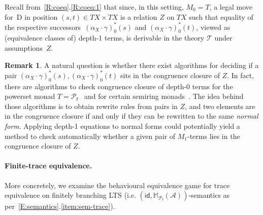 \documentclass[sigconf,
			final%
			nonacm
                        ]{acmart}
\numberwithin{equation}{section}
\numberwithin{equation}{section}
\theoremstyle{plain}
\theoremstyle{definition}
\newtheorem{rem}[thm]{Remark}
\newcommand{\id}{\mathsf{id}}
\newcommand{\M}{\mathbb{M}}                   %
\newcommand{\T}{\mathcal{T}}                     %
\newcommand{\A}{\mathcal{A}}            %
\newcommand{\pow}{\mathscr P}              %
\newcommand{\powf}{\pow_{\mathsf f}}
\begin{document}
\noindent Recall from~\cref{R:coeq}.\ref{R:coeq:1} that since, in
this setting, $M_0=T$, a legal move for~D in position
$(s,t)\in TX\times TX$ is a relation $Z$ on $TX$ such
that equality of the respective successors~$(\alpha_X\cdot \gamma)^*_0(s)$
and $(\alpha_X\cdot \gamma)^*_0(t)$, viewed
as (equivalence classes of) depth-1 terms, is derivable in the theory
$\T$ under assumptions~$Z$.

\begin{rem}
  A natural question is whether there exist algorithms for deciding if
  a pair $(\alpha_X\cdot \gamma)^*_0(s),(\alpha_X\cdot \gamma)^*_0(t)$
  sits in the congruence closure of $Z$.  In fact, there are
  algorithms to check congruence closure of depth-0 terms for the
  powerset monad $T=\powf$~\cite{bp:checking-nfa-equiv} and for
  certain semiring monads~\cite{bkk:up-to-weighted}.  The idea behind
  those algorithms is to obtain rewrite rules from pairs in $Z$, and
  two elements are in the congruence closure if and only if they can
  be rewritten to the same \emph{normal form}. Applying depth-1
  equations to normal forms could potentially yield a method to check
  automatically whether a given pair of $M_1$-terms lies in the
  congruence closure of $Z$.
\end{rem}

\paragraph*{Finite-trace equivalence.}
More concretely, we examine the behavioural equivalence game for trace
equivalence on finitely branching LTS (i.e.
$(\id, \M_{\powf}(\A))$-semantics as
per~\cref{E:semantics}.\ref{item:sem-trace}).

\end{document}
